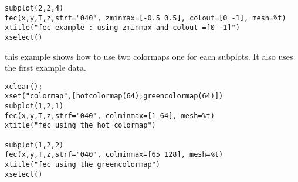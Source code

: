\begin{examples}
\begin{Verbatim}
subplot(2,2,4)
fec(x,y,T,z,strf="040", zminmax=[-0.5 0.5], colout=[0 -1], mesh=%t)
xtitle("fec example : using zminmax and colout =[0 -1]")
xselect()
\end{Verbatim}

\noindent this example shows how to use two colormaps one for each subplots. It
also uses the first example data.

\begin{Verbatim}
xclear();
xset("colormap",[hotcolormap(64);greencolormap(64)])
subplot(1,2,1)
fec(x,y,T,z,strf="040", colminmax=[1 64], mesh=%t)
xtitle("fec using the hot colormap")

subplot(1,2,2)
fec(x,y,T,z,strf="040", colminmax=[65 128], mesh=%t)
xtitle("fec using the greencolormap")
xselect()
\end{Verbatim}
\end{examples}
  \begin{manseealso}
      
  \end{manseealso}
